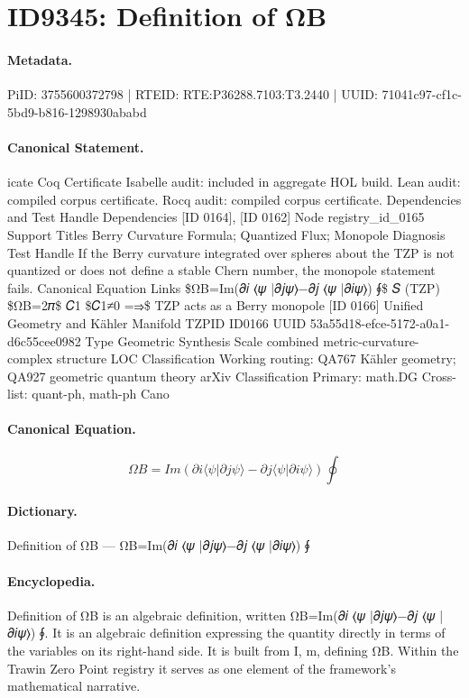 \section*{ID9345: Definition of ΩB}
\paragraph{Metadata.}
PiID: 3755600372798 | RTEID: RTE:P36288.7103:T3.2440 | UUID: 71041c97-cf1c-5bd9-b816-1298930ababd

\paragraph{Canonical Statement.}
icate Coq Certificate Isabelle audit: included in aggregate HOL build. Lean audit: compiled corpus certificate. Rocq audit: compiled corpus certificate. Dependencies and Test Handle Dependencies [ID 0164], [ID 0162] Node registry\_id\_0165 Support Titles Berry Curvature Formula; Quantized Flux; Monopole Diagnosis Test Handle If the Berry curvature integrated over spheres about the TZP is not quantized or does not define a stable Chern number, the monopole statement fails. Canonical Equation Links \$ΩB=Im(𝜕𝑖 ⟨𝜓 |𝜕𝑗𝜓⟩−𝜕𝑗 ⟨𝜓 |𝜕𝑖𝜓⟩) ∮\$ 𝑆 (TZP) \$ΩB=2𝜋\$ 𝐶1 \$𝐶1≠0 =⇒\$ TZP acts as a Berry monopole [ID 0166] Unified Geometry and Kähler Manifold TZPID ID0166 UUID 53a55d18-efce-5172-a0a1-d6c55cee0982 Type Geometric Synthesis Scale combined metric-curvature-complex structure LOC Classification Working routing: QA767 Kähler geometry; QA927 geometric quantum theory arXiv Classification Primary: math.DG Cross-list: quant-ph, math-ph Cano

\paragraph{Canonical Equation.}
\[
ΩB=Im(𝜕𝑖 ⟨𝜓 |𝜕𝑗𝜓⟩−𝜕𝑗 ⟨𝜓 |𝜕𝑖𝜓⟩) ∮
\]

\paragraph{Dictionary.}
Definition of ΩB — ΩB=Im(𝜕𝑖 ⟨𝜓 |𝜕𝑗𝜓⟩−𝜕𝑗 ⟨𝜓 |𝜕𝑖𝜓⟩) ∮

\paragraph{Encyclopedia.}
Definition of ΩB is an algebraic definition, written ΩB=Im(𝜕𝑖 ⟨𝜓 |𝜕𝑗𝜓⟩−𝜕𝑗 ⟨𝜓 |𝜕𝑖𝜓⟩) ∮. It is an algebraic definition expressing the quantity directly in terms of the variables on its right-hand side. It is built from I, m, defining ΩB. Within the Trawin Zero Point registry it serves as one element of the framework's mathematical narrative.
